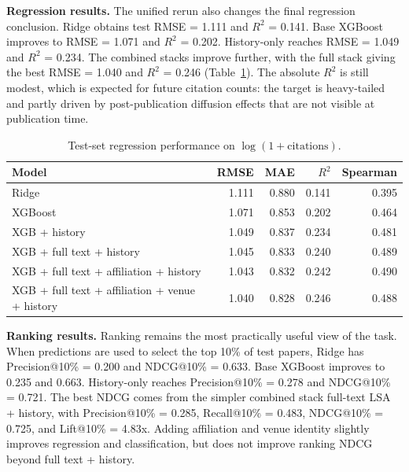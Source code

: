 \textbf{Regression results.} The unified rerun also changes the final
regression conclusion. Ridge obtains test RMSE = 1.111 and $R^2$ = 0.141.
Base XGBoost improves to RMSE = 1.071 and $R^2$ = 0.202. History-only reaches
RMSE = 1.049 and $R^2$ = 0.234. The combined stacks improve further, with the
full stack giving the best RMSE = 1.040 and $R^2$ = 0.246
(Table~\ref{tab:final-xgb-regression}). The absolute $R^2$ is still modest,
which is expected for future citation counts: the target is heavy-tailed and
partly driven by post-publication diffusion effects that are not visible at
publication time.

\begin{table}[t]
\centering
\begin{tabular}{lrrrr}
\hline
Model & RMSE & MAE & $R^2$ & Spearman \\
\hline
Ridge & 1.111 & 0.880 & 0.141 & 0.395 \\
XGBoost & 1.071 & 0.853 & 0.202 & 0.464 \\
XGB + history & 1.049 & 0.837 & 0.234 & 0.481 \\
XGB + full text + history & 1.045 & 0.833 & 0.240 & 0.489 \\
XGB + full text + affiliation + history & 1.043 & 0.832 & 0.242 & 0.490 \\
XGB + full text + affiliation + venue + history & 1.040 & 0.828 & 0.246 & 0.488 \\
\hline
\end{tabular}
\caption{Test-set regression performance on $\log(1+\text{citations})$.}
\label{tab:final-xgb-regression}
\end{table}

\textbf{Ranking results.} Ranking remains the most practically useful view of
the task. When predictions are used to select the top 10\% of test papers,
Ridge has Precision@10\% = 0.200 and NDCG@10\% = 0.633. Base XGBoost improves
to 0.235 and 0.663. History-only reaches Precision@10\% = 0.278 and
NDCG@10\% = 0.721. The best NDCG comes from the simpler combined stack
full-text LSA + history, with Precision@10\% = 0.285, Recall@10\% = 0.483,
NDCG@10\% = 0.725, and Lift@10\% = 4.83x. Adding affiliation and venue
identity slightly improves regression and classification, but does not improve
ranking NDCG beyond full text + history.

